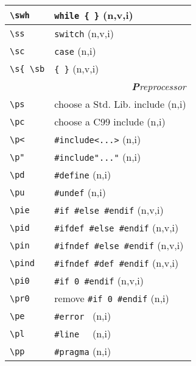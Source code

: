\documentclass[oneside,11pt,landscape,DIV16]{scrartcl}
\begin{document}
\begin{multicols}{3}
\begin{center}
\begin{tabular}[]{|p{15mm}|p{55mm}|}
\hline \verb'\swh' & \verb'while { }'           \hfill (n,v,i)\\
\hline \verb'\ss'  & \verb'switch'              \hfill (n,v,i)\\
\hline \verb'\sc'  & \verb'case'                \hfill (n,i)\\
\hline \verb'\s{ \sb'  & \verb'{ }'             \hfill (n,v,i)\\
\hline
\hline
\multicolumn{2}{|r|}{\textsl{\textbf{P}reprocessor}}   \\
\hline \verb'\ps'   & choose a Std. Lib. include    \hfill (n,i)\\
\hline \verb'\pc'   & choose a C99 include         \hfill (n,i)\\
\hline \verb'\p<'   & \verb$#include<...>$         \hfill (n,i)\\
\hline \verb'\p"'   & \verb$#include"..."$         \hfill (n,i)\\
\hline \verb'\pd'   & \verb'#define'               \hfill (n,i)\\
\hline \verb'\pu'   & \verb'#undef'                \hfill (n,i)\\
\hline \verb'\pie'  & \verb'#if #else #endif'      \hfill (n,v,i)\\
\hline \verb'\pid'  & \verb'#ifdef #else #endif'   \hfill (n,v,i)\\
\hline \verb'\pin'  & \verb'#ifndef #else #endif'  \hfill (n,v,i)\\
\hline \verb'\pind' & \verb'#ifndef #def #endif'   \hfill (n,v,i)\\
\hline \verb'\pi0'  & \verb'#if 0 #endif'          \hfill (n,v,i)\\
\hline \verb'\pr0'  & remove \verb'#if 0 #endif'   \hfill (n,i)\\
\hline \verb'\pe'   & \verb'#error '               \hfill (n,i)\\
\hline \verb'\pl'   & \verb'#line  '               \hfill (n,i)\\
\hline \verb'\pp'   & \verb'#pragma'               \hfill (n,i)\\
\hline
\end{tabular} \\


\end{center}
\end{multicols}
\end{document}
